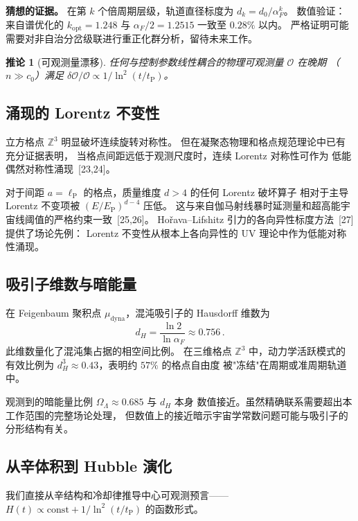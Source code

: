 \documentclass[a4paper,11pt]{article}
\theoremstyle{plain}
\newtheorem{corollary}{推论}
\newcommand{\lnq}{\ln^2}
\newcommand{\tP}{t_{\mathrm{P}}}
\newcommand{\lP}{\ell_{\mathrm{P}}}
\newcommand{\ZZ}{\mathbb{Z}}
\begin{document}
\textbf{猜想的证据。}
在第 $k$ 个倍周期层级，轨道直径标度为 $d_k = d_0/\alpha_F^k$。
数值验证：来自谱优化的 $k_{\mathrm{opt}} = 1.248$ 与
$\alpha_F/2 = 1.2515$ 一致至 $0.28\%$ 以内。
严格证明可能需要对非自治分岔级联进行重正化群分析，留待未来工作。

\begin{corollary}[可观测量漂移]\label{cor:drift}
任何与控制参数线性耦合的物理可观测量 $\mathcal{O}$ 在晚期
（$n \gg c_0$）满足
$\delta\mathcal{O}/\mathcal{O} \propto 1/\lnq(t/\tP)$。
\end{corollary}

\subsection{涌现的 Lorentz 不变性}

立方格点 $\ZZ^3$ 明显破坏连续旋转对称性。
但在凝聚态物理和格点规范理论中已有充分证据表明，
当格点间距远低于观测尺度时，连续 Lorentz 对称性可作为
低能偶然对称性涌现~[23,24]。

对于间距 $a = \lP$ 的格点，质量维度 $d > 4$ 的任何 Lorentz 破坏算子
相对于主导 Lorentz 不变项被 $(E/E_{\mathrm{P}})^{d-4}$ 压低。
这与来自伽马射线暴时延测量和超高能宇宙线阈值的严格约束一致~[25,26]。
Ho\v{r}ava--Lifshitz 引力的各向异性标度方法~[27]提供了场论先例：
Lorentz 不变性从根本上各向异性的 UV 理论中作为低能对称性涌现。

\subsection{吸引子维数与暗能量}

在 Feigenbaum 聚积点 $\mu_{\mathrm{dyna}}$，混沌吸引子的 Hausdorff 维数为
\begin{equation}
  d_H = \frac{\ln 2}{\ln \alpha_F} \approx 0.756\,.
\end{equation}
此维数量化了混沌集占据的相空间比例。
在三维格点 $\ZZ^3$ 中，动力学活跃模式的有效比例为
$d_H^3 \approx 0.43$，表明约 $57\%$ 的格点自由度
被"冻结"在周期或准周期轨道中。

观测到的暗能量比例 $\Omega_\Lambda \approx 0.685$ 与 $d_H$ 本身
数值接近。虽然精确联系需要超出本工作范围的完整场论处理，
但数值上的接近暗示宇宙学常数问题可能与吸引子的分形结构有关。

\subsection{从辛体积到 Hubble 演化}

我们直接从辛结构和冷却律推导中心可观测预言——
$H(t) \propto \mathrm{const} + 1/\lnq(t/\tP)$ 的函数形式。
\end{document}
